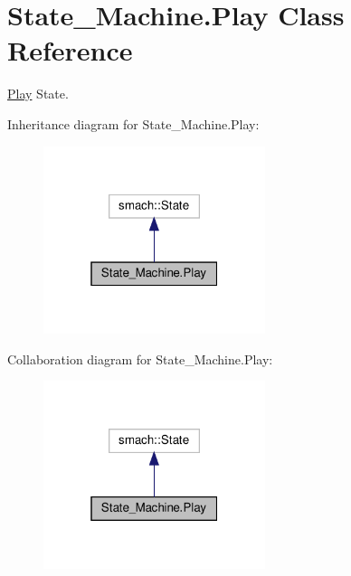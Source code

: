 \hypertarget{classState__Machine_1_1Play}{}\section{State\+\_\+\+Machine.\+Play Class Reference}
\label{classState__Machine_1_1Play}


\hyperlink{classState__Machine_1_1Play}{Play} State.  




Inheritance diagram for State\+\_\+\+Machine.\+Play\+:
\nopagebreak
\begin{figure}[H]
\begin{center}
\leavevmode
\includegraphics[width=184pt]{classState__Machine_1_1Play__inherit__graph}
\end{center}
\end{figure}


Collaboration diagram for State\+\_\+\+Machine.\+Play\+:
\nopagebreak
\begin{figure}[H]
\begin{center}
\leavevmode
\includegraphics[width=184pt]{classState__Machine_1_1Play__coll__graph}
\end{center}
\end{figure}
